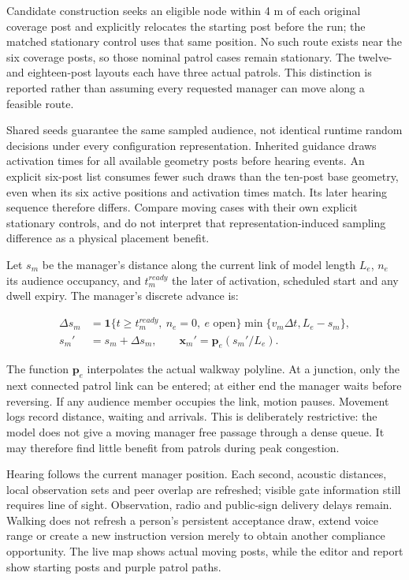 \documentclass[11pt,a4paper]{article}
\begin{document}
Candidate construction seeks an eligible node within 4 m of each original coverage post and explicitly relocates the starting post before the run; the matched stationary control uses that same position. No such route exists near the six coverage posts, so those nominal patrol cases remain stationary. The twelve- and eighteen-post layouts each have three actual patrols. This distinction is reported rather than assuming every requested manager can move along a feasible route.


Shared seeds guarantee the same sampled audience, not identical runtime random decisions under every configuration representation. Inherited guidance draws activation times for all available geometry posts before hearing events. An explicit six-post list consumes fewer such draws than the ten-post base geometry, even when its six active positions and activation times match. Its later hearing sequence therefore differs. Compare moving cases with their own explicit stationary controls, and do not interpret that representation-induced sampling difference as a physical placement benefit.


Let $s_m$ be the manager's distance along the current link of model length $L_e$, $n_e$ its audience occupancy, and $t_m^{ready}$ the later of activation, scheduled start and any dwell expiry. The manager's discrete advance is:


\begin{equation}
\begin{aligned}
 \Delta s_m&=\mathbf1\{t\ge t_m^{ready},\ n_e=0,\ e\text{ open}\}
 \min\{v_m\Delta t,L_e-s_m\},\\
 s_m'&=s_m+\Delta s_m,\qquad
 \boldsymbol{x}_m'=\boldsymbol{p}_e(s_m'/L_e).
\end{aligned}\tag{34}\label{eq:34}
\end{equation}

The function $\boldsymbol{p}_e$ interpolates the actual walkway polyline. At a junction, only the next connected patrol link can be entered; at either end the manager waits before reversing. If any audience member occupies the link, motion pauses. Movement logs record distance, waiting and arrivals. This is deliberately restrictive: the model does not give a moving manager free passage through a dense queue. It may therefore find little benefit from patrols during peak congestion.


Hearing follows the current manager position. Each second, acoustic distances, local observation sets and peer overlap are refreshed; visible gate information still requires line of sight. Observation, radio and public-sign delivery delays remain. Walking does not refresh a person's persistent acceptance draw, extend voice range or create a new instruction version merely to obtain another compliance opportunity. The live map shows actual moving posts, while the editor and report show starting posts and purple patrol paths.
\end{document}
